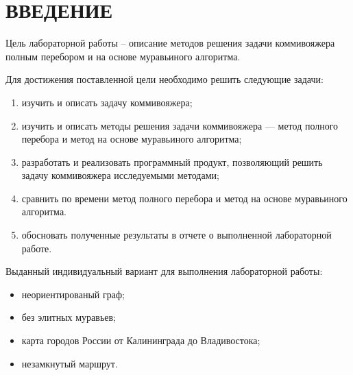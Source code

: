 \chapter*{ВВЕДЕНИЕ}


Цель лабораторной работы – описание методов решения задачи коммивояжера полным перебором и на основе муравьиного алгоритма.

Для достижения поставленной цели необходимо решить следующие задачи:

\begin{enumerate}[label={\arabic*)}]
	\item изучить и описать задачу коммивояжера;
	\item изучить и описать методы решения задачи коммивояжера ---  метод полного перебора и метод на основе муравьиного алгоритма;
	\item разработать и реализовать программный продукт, позволяющий решить задачу коммивояжера исследуемыми методами;
	\item сравнить по времени метод полного перебора и метод на основе муравьиного алгоритма.
	\item обосновать полученные результаты в отчете о выполненной лабораторной работе.
\end{enumerate}

Выданный индивидуальный вариант для выполнения лабораторной работы:

\begin{itemize}[label*=--]
	\item неориентированый граф;
	\item без элитных муравьев;
	\item карта городов России от Калининграда до Владивостока;
	\item незамкнутый маршрут.
\end{itemize}